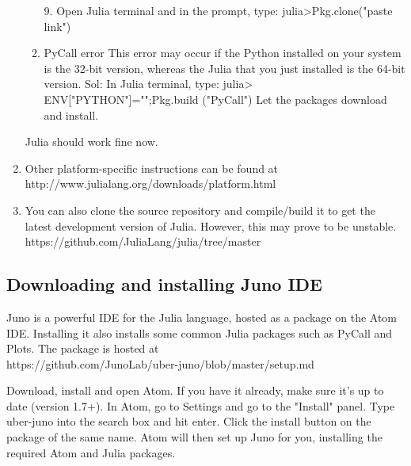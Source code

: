 \begin{enumerate}
\begin{enumerate}
            9. Open Julia terminal and in the prompt, type:
            julia>Pkg.clone("paste link")
            
      \item PyCall error
            This error may occur if the Python installed on your system is the 32-bit version, whereas the Julia that you just installed is the 64-bit version.
            Sol: In Julia terminal, type:
            julia> ENV["PYTHON"]="";Pkg.build ("PyCall")
            Let the packages download and install.
\end{enumerate}

Julia should work fine now.


\item Other platform-specific instructions can be found at \\ 
http://www.julialang.org/downloads/platform.html 

\item You can also clone the source repository and compile/build it to get the  
latest development version of Julia. However, this may prove to be unstable.
https://github.com/JuliaLang/julia/tree/master 

\end {enumerate}

\subsection{Downloading and installing Juno IDE}\label{juno-ide-installation}

Juno is a powerful IDE for the Julia language, hosted as a package on the Atom IDE. Installing it also installs some common Julia packages such as PyCall and Plots. The package is hosted at \\
https://github.com/JunoLab/uber-juno/blob/master/setup.md 

Download, install and open Atom. If you have it already, make sure it's up to date (version 1.7+).
In Atom, go to Settings and go to the "Install" panel.
Type uber-juno into the search box and hit enter. Click the install button on the package of the same name.
Atom will then set up Juno for you, installing the required Atom and Julia packages.

